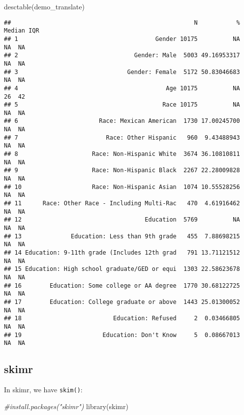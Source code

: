 \documentclass[
]{book}
\newenvironment{Shaded}{\begin{snugshade}}{\end{snugshade}}
\newcommand{\CommentTok}[1]{\textcolor[rgb]{0.56,0.35,0.01}{\textit{#1}}}
\newcommand{\FunctionTok}[1]{\textcolor[rgb]{0.00,0.00,0.00}{#1}}
\newcommand{\NormalTok}[1]{#1}
\begin{document}
\begin{Shaded}
\begin{Highlighting}[]
\FunctionTok{desctable}\NormalTok{(demo\_translate)}
\end{Highlighting}
\end{Shaded}

\begin{verbatim}
##                                                    N           % Median IQR
## 1                                       Gender 10175          NA     NA  NA
## 2                                 Gender: Male  5003 49.16953317     NA  NA
## 3                               Gender: Female  5172 50.83046683     NA  NA
## 4                                          Age 10175          NA     26  42
## 5                                         Race 10175          NA     NA  NA
## 6                       Race: Mexican American  1730 17.00245700     NA  NA
## 7                         Race: Other Hispanic   960  9.43488943     NA  NA
## 8                     Race: Non-Hispanic White  3674 36.10810811     NA  NA
## 9                     Race: Non-Hispanic Black  2267 22.28009828     NA  NA
## 10                    Race: Non-Hispanic Asian  1074 10.55528256     NA  NA
## 11      Race: Other Race - Including Multi-Rac   470  4.61916462     NA  NA
## 12                                   Education  5769          NA     NA  NA
## 13              Education: Less than 9th grade   455  7.88698215     NA  NA
## 14 Education: 9-11th grade (Includes 12th grad   791 13.71121512     NA  NA
## 15 Education: High school graduate/GED or equi  1303 22.58623678     NA  NA
## 16        Education: Some college or AA degree  1770 30.68122725     NA  NA
## 17        Education: College graduate or above  1443 25.01300052     NA  NA
## 18                          Education: Refused     2  0.03466805     NA  NA
## 19                       Education: Don't Know     5  0.08667013     NA  NA
\end{verbatim}

\hypertarget{skimr}{%
\subsection{skimr}\label{skimr}}

In skimr, we have \texttt{skim()}:

\begin{Shaded}
\begin{Highlighting}[]
\CommentTok{\#install.packages("skimr")}
\FunctionTok{library}\NormalTok{(skimr)}
\end{Highlighting}
\end{Shaded}
\end{document}
